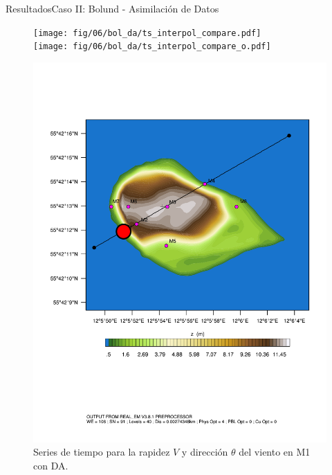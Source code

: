 \documentclass[mathserif,10pt]{beamer}
\begin{document}
\begin{frame}{Resultados}{Caso II: Bolund - Asimilación de Datos}
	\begin{figure}[H]
		\begin{minipage}{0.65\linewidth}
			\texttt{[image: fig/06/bol\_da/ts\_interpol\_compare.pdf]}\\%
			\texttt{[image: fig/06/bol\_da/ts\_interpol\_compare\_o.pdf]}%
		\end{minipage}%
		\begin{minipage}{0.35\linewidth}
			\centering
			\includegraphics[width=1\linewidth,page=1,trim={3.5cm 9.3cm 0.8cm 3.8cm},clip]{fig/05/ppt/bol_control_point1.pdf}%
		\end{minipage}%
		\vspace{-2mm}\caption{Series de tiempo para la rapidez $V$ y dirección $\theta$ del viento en M1 con DA.}
		\label{fig:06_bol_da_ts_m1}
	\end{figure}
\end{frame}
\end{document}
